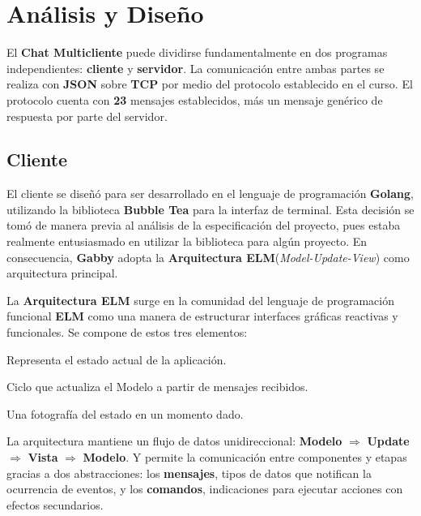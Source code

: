 \section{Análisis y Diseño}
\label{sec:analisis-diseno}

El \textbf{Chat Multicliente} puede dividirse fundamentalmente en dos programas independientes:
\textbf{cliente} y \textbf{servidor}. La comunicación entre ambas partes se realiza con \textbf{JSON}
sobre \textbf{TCP} por medio del protocolo establecido en el curso. El protocolo cuenta con \textbf{23}
mensajes establecidos, más un mensaje genérico de respuesta por parte del servidor.

\subsection*{Cliente}

El cliente se diseñó para ser desarrollado en el lenguaje de programación \textbf{Golang}, utilizando 
la biblioteca \textbf{Bubble Tea} para la interfaz de terminal. Esta decisión se tomó de manera previa
al análisis de la especificación del proyecto, pues estaba realmente entusiasmado en utilizar la 
biblioteca para algún proyecto. En consecuencia, \textbf{Gabby} adopta la \textbf{Arquitectura ELM}(\textit{Model-Update-View})
como arquitectura principal. 

La \textbf{Arquitectura ELM} surge en la comunidad del lenguaje de programación funcional \textbf{ELM}
como una manera de estructurar interfaces gráficas reactivas y funcionales. Se compone de estos tres elementos:

\begin{description}[leftmargin=2.2cm, style=nextline, font=\bfseries]
    \item[Modelo] Representa el estado actual de la aplicación.
    \item[Update] Ciclo que actualiza el Modelo a partir de mensajes recibidos.
    \item[Vista] Una fotografía del estado en un momento dado.
\end{description}

La arquitectura mantiene un flujo de datos unidireccional: \textbf{Modelo} $\Rightarrow$ \textbf{Update} $\Rightarrow$ 
\textbf{Vista}  $\Rightarrow$ \textbf{Modelo}. Y permite la comunicación entre componentes y etapas gracias a dos abstracciones: 
los \textbf{mensajes}, tipos de datos que notifican la ocurrencia de eventos, y los \textbf{comandos}, indicaciones para 
ejecutar acciones con efectos secundarios.

